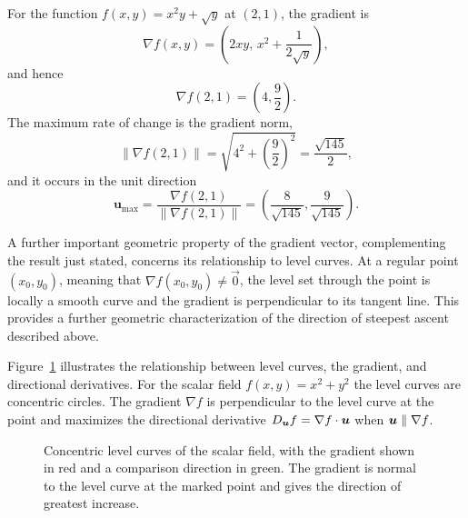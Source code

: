 For the function $f(x,y) = x^2 y + \sqrt{y}$ at $(2,1)$, the gradient is
\[
\nabla f(x,y)=\left(2xy,\,x^2+\frac{1}{2\sqrt y}\right),
\]
and hence
\[
\nabla f(2,1)=\left(4,\frac92\right).
\]
The maximum rate of change is the gradient norm,
\[
\left\|\nabla f(2,1)\right\|
=\sqrt{4^2+\left(\frac92\right)^2}
=\frac{\sqrt{145}}{2},
\]
and it occurs in the unit direction
\[
\mathbf{u}_{\max}
=\frac{\nabla f(2,1)}{\|\nabla f(2,1)\|}
=\left(\frac8{\sqrt{145}},\frac9{\sqrt{145}}\right).
\]

A further important geometric property of the gradient vector, complementing the result just stated, concerns its relationship to level curves. At a regular point $(x_0,y_0)$, meaning that $\nabla f(x_0,y_0)\neq\vec{0}$, the level set through the point is locally a smooth curve and the gradient is perpendicular to its tangent line. This provides a further geometric characterization of the direction of steepest ascent described above.

Figure~\ref{fig:ch9-gradient} illustrates the relationship between level curves, the gradient, and directional derivatives. For the scalar field $f(x,y)=x^2+y^2$ the level curves are concentric circles. The gradient $\nabla f$ is perpendicular to the
level curve at the point and maximizes the directional derivative $D_{\bm{u}} f = \nabla f \cdot \bm{u}$ when $\bm{u} \parallel \nabla f$.

\begin{figure}[!htbp]
\centering
{}
\caption[Level curves, gradient, and directional derivative]{Concentric level curves of the scalar field, with the gradient shown in red and a comparison direction in green. The gradient is normal to the level curve at the marked point and gives the direction of greatest increase.}
\label{fig:ch9-gradient}
\end{figure}

